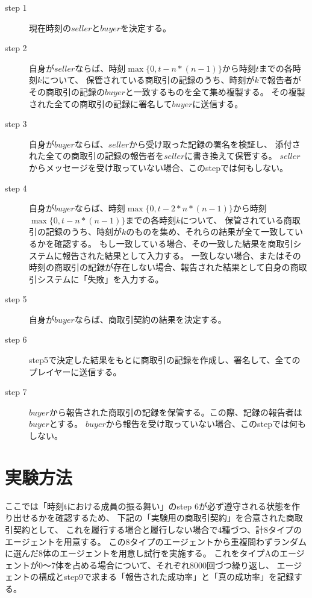\begin{description}
  \item[step 1] 現在時刻の$seller$と$buyer$を決定する。 
  \item[step 2] 自身が$seller$ならば、時刻$\max\{0, t-n*(n-1)\}$から時刻$t$までの各時刻$k$について、
    保管されている商取引の記録のうち、時刻が$k$で報告者がその商取引の記録の$buyer$と一致するものを全て集め複製する。
    その複製された全ての商取引の記録に署名して$buyer$に送信する。
  \item[step 3] 自身が$buyer$ならば、$seller$から受け取った記録の署名を検証し、
    添付された全ての商取引の記録の報告者を$seller$に書き換えて保管する。
    $seller$からメッセージを受け取っていない場合、このstepでは何もしない。
  \item[step 4] 自身が$buyer$ならば、時刻$\max\{0, t-2*n*(n-1)\}$から時刻$\max\{0, t-n*(n-1)\}$までの各時刻$k$について、
    保管されている商取引の記録のうち、時刻が$k$のものを集め、それらの結果が全て一致しているかを確認する。
    もし一致している場合、その一致した結果を商取引システムに報告された結果として入力する。
    一致しない場合、またはその時刻の商取引の記録が存在しない場合、報告された結果として自身の商取引システムに「失敗」を入力する。
  \item[step 5] 自身が$buyer$ならば、商取引契約の結果を決定する。
  \item[step 6] step5で決定した結果をもとに商取引の記録を作成し、署名して、全てのプレイヤーに送信する。
  \item[step 7] $buyer$から報告された商取引の記録を保管する。この際、記録の報告者は$buyer$とする。
    $buyer$から報告を受け取っていない場合、このstepでは何もしない。
\end{description}

\section{実験方法}
  ここでは「時刻tにおける成員の振る舞い」のstep 6が必ず遵守される状態を作り出せるかを確認するため、
  下記の「実験用の商取引契約」を合意された商取引契約として、
  これを履行する場合と履行しない場合で4種づつ、計8タイプのエージェントを用意する。
  この8タイプのエージェントから重複問わずランダムに選んだ8体のエージェントを用意し試行を実施する。
  これをタイプAのエージェントが0〜7体を占める場合について、それぞれ8000回づつ繰り返し、
  エージェントの構成とstep9で求まる「報告された成功率」と「真の成功率」を記録する。

